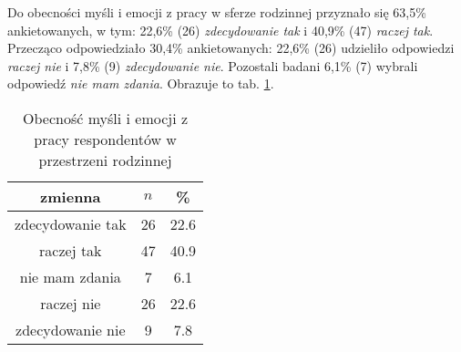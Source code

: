   Do obecności myśli i emocji z pracy w sferze rodzinnej przyznało się 63,5\% ankietowanych, w tym: 22,6\% (26) \textit{zdecydowanie tak} i 40,9\% (47) \textit{raczej tak}. Przecząco odpowiedziało 30,4\% ankietowanych: 22,6\% (26) udzieliło odpowiedzi \textit{raczej nie} i 7,8\% (9) \textit{zdecydowanie nie}. Pozostali badani 6,1\% (7) wybrali odpowiedź \textit{nie mam zdania}. Obrazuje to tab. \ref{tab:Q10}.

\begin{table}[H]
\caption{Obecność myśli i emocji z pracy respondentów w przestrzeni rodzinnej}
\centering
\begin{tabular}{ | c | c | c |}
\hline
zmienna & $n$ & \% \\
\hline
zdecydowanie tak  &  26  & 22.6\\
\hline
raczej tak  &  47  & 40.9 \\
\hline
nie mam zdania  &  7  & 6.1\\
\hline
raczej nie  &  26  & 22.6\\
\hline
zdecydowanie nie  &  9  & 7.8 \\
\hline
\end{tabular}
\label{tab:Q10}
\end{table}


